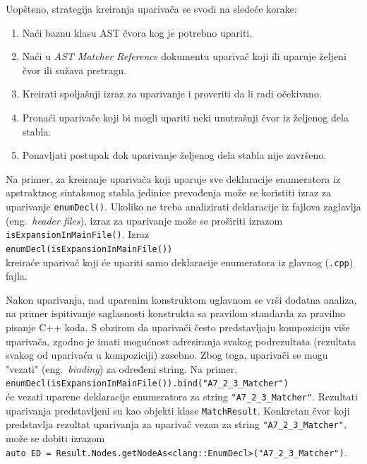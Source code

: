 \documentclass[12pt,oneside]{memoir}
\begin{document}
Uopšteno, strategija kreiranja upariva\v{c}a se svodi na sledeće korake:
\begin{enumerate}
\item Na\'{c}i baznu klasu AST \v{c}vora kog je potrebno upariti.
 
\item Na\'{c}i u \textit{AST Matcher Reference} dokumentu \cite{ASTMatcherReference} upariva\v{c} koji ili uparuje \v{z}eljeni čvor ili su\v{z}ava pretragu.
\item Kreirati spoljašnji izraz za uparivanje i proveriti da li radi o\v{c}ekivano.
\item Prona\'{c}i upariva\v{c}e koji bi mogli upariti neki unutrašnji čvor iz željenog dela stabla.
\item Ponavljati postupak dok uparivanje željenog dela stabla nije završeno.
\end{enumerate}

\par
Na primer, za kreiranje upariva\v{c}a koji uparuje sve deklaracije enumeratora iz apstraktnog sintaksnog stabla jedinice prevođenja mo\v{z}e se koristiti izraz za uparivanje \texttt{enumDecl()}. Ukoliko ne treba analizirati deklaracije iz fajlova zaglavlja (eng.~\textit{header files}), izraz za uparivanje mo\v{z}e se pro\v{s}iriti izrazom \texttt{isExpansionInMainFile()}. Izraz \\ \texttt{enumDecl(isExpansionInMainFile())} \\ kreira\'{c}e upariva\v{c} koji \'{c}e upariti samo deklaracije enumeratora iz glavnog (\texttt{.cpp}) fajla.

Nakon uparivanja, nad uparenim konstruktom uglavnom se vr\v{s}i dodatna analiza, na primer ispitivanje saglasnosti konstrukta sa pravilom standarda za pravilno pisanje C++ koda.
S obzirom da upariva\v{c}i \v{c}esto predstavljaju kompoziciju vi\v{s}e upariva\v{c}a, zgodno je imati mogu\'{c}nost adresiranja svakog podrezultata (rezultata svakog od upariva\v{c}a u kompoziciji) zasebno.
Zbog toga, upariva\v{c}i se mogu "vezati" (eng.~\textit{binding}) za određeni string. Na primer, \\
\texttt{enumDecl(isExpansionInMainFile()).bind("A7\_2\_3\_Matcher")} \\ će vezati uparene deklaracije enumeratora za string \texttt{"A7\_2\_3\_Matcher"}. Rezultati uparivanja predstavljeni su kao objekti klase \texttt{MatchResult}. Konkretan \v{c}vor koji predstavlja rezultat uparivanja za upariva\v{c} vezan za string \texttt{"A7\_2\_3\_Matcher"},
mo\v{z}e se dobiti izrazom \\ \texttt{auto ED = Result.Nodes.getNodeAs<clang::EnumDecl>("A7\_2\_3\_Matcher")}.
\end{document}
